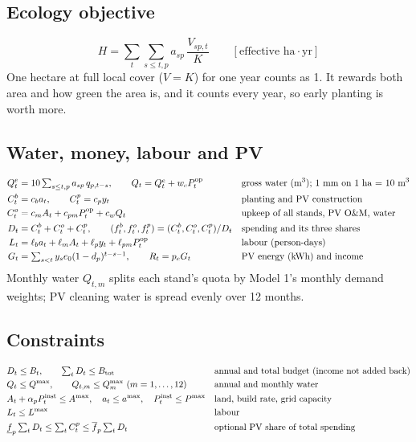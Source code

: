 \documentclass[11pt,a4paper]{article}
\begin{document}
\subsection{Ecology objective}
\begin{equation}\label{eq:H}
H=\sum_{t}\sum_{s\le t,p}a_{sp}\,\frac{V_{sp,t}}{K}\qquad[\text{effective ha}\cdot\text{yr}]
\end{equation}
One hectare at full local cover ($V=K$) for one year counts as 1. It rewards both area and how green the area is,
and it counts every year, so early planting is worth more.

\subsection{Water, money, labour and PV}
\begin{align}
Q_t^e&=10\textstyle\sum_{s\le t,p}a_{sp}\,q_{p,t-s},\qquad Q_t=Q_t^e+w_cP_t^{\rm op} &&\text{gross water (m$^3$); 1 mm on 1 ha = 10 m$^3$}\label{eq:water}\\
C_t^b&=c_ba_t,\qquad C_t^p=c_py_t &&\text{planting and PV construction}\\
C_t^o&=c_mA_t+c_{pm}P_t^{\rm op}+c_wQ_t &&\text{upkeep of all stands, PV O\&M, water}\\
D_t&=C_t^b+C_t^o+C_t^p,\qquad (f_t^b,f_t^o,f_t^p)=(C_t^b,C_t^o,C_t^p)/D_t &&\text{spending and its three shares}\label{eq:shares}\\
L_t&=\ell_ba_t+\ell_mA_t+\ell_py_t+\ell_{pm}P_t^{\rm op} &&\text{labour (person-days)}\label{eq:labour}\\
G_t&=\textstyle\sum_{s<t}y_se_0(1-d_p)^{t-s-1},\qquad R_t=p_eG_t &&\text{PV energy (kWh) and income}\label{eq:pv}
\end{align}
Monthly water $Q_{t,m}$ splits each stand's quota by Model 1's monthly demand weights; PV cleaning water is spread evenly over 12 months.

\subsection{Constraints}
\begin{align}
&D_t\le B_t,\qquad \textstyle\sum_tD_t\le B_{\rm tot} &&\text{annual and total budget (income not added back)}\label{eq:budget}\\
&Q_t\le Q^{\max},\qquad Q_{t,m}\le Q_m^{\max}\ (m=1,\dots,12) &&\text{annual and monthly water}\\
&A_t+\alpha_pP_t^{\rm inst}\le A^{\max},\quad a_t\le a^{\max},\quad P_t^{\rm inst}\le P^{\max} &&\text{land, build rate, grid capacity}\\
&L_t\le L^{\max} &&\text{labour}\label{eq:lab}\\
&\underline f_p\textstyle\sum_tD_t\le\sum_tC_t^p\le\overline f_p\sum_tD_t &&\text{optional PV share of total spending}
\end{align}
\end{document}
